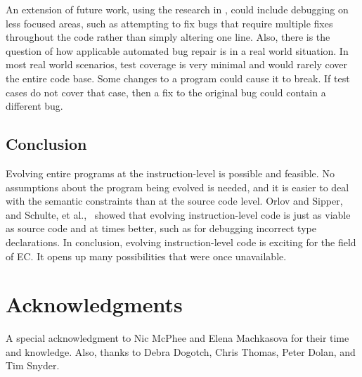 \documentclass{sig-alternate}
\begin{document}
An extension of future work, using the research in \cite{Assembly:2010}, could include debugging on less focused areas, such as attempting to fix bugs that require multiple fixes throughout the code rather than simply altering one line. Also, there is the question of how applicable automated bug repair is in a real world situation. In most real world scenarios, test coverage is very minimal and would rarely cover the entire code base. Some changes to a program could cause it to break. If test cases do not cover that case, then a fix to the original bug could contain a different bug. 


\subsection{Conclusion}
Evolving entire programs at the instruction-level is possible and feasible. No assumptions about the program being evolved is needed, and it is easier to deal with the semantic constraints than at the source code level. Orlov and Sipper, and Schulte, et al.,~\cite{FINCH:2011,Assembly:2010} showed that evolving instruction-level code is just as viable as source code and at times better, such as for debugging incorrect type declarations. In conclusion, evolving instruction-level code is exciting for the field of EC. It opens up many possibilities that were once unavailable.

\section*{Acknowledgments}
A special acknowledgment to Nic McPhee and Elena Machkasova for their time and knowledge. Also, thanks to Debra Dogotch, Chris Thomas, Peter Dolan, and Tim Snyder.

%

%
%
\end{document}
